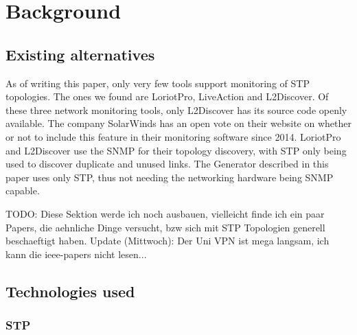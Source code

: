 \chapter{Background}
\section{Existing alternatives}
As of writing this paper, only very few tools support monitoring of STP topologies.
The ones we found are LoriotPro\cite{LoriotPro}, LiveAction\cite{LiveAction} and L2Discover\cite{L2Discover}.
Of these three network monitoring tools, only L2Discover has its source code openly available.
The company SolarWinds has an open vote on their website on whether or not to include this feature in their monitoring software since 2014\cite{thwackSW}.
LoriotPro and L2Discover use the SNMP for their topology discovery, with STP only being used to discover duplicate and unused links.
The Generator described in this paper uses only STP, thus not needing the networking hardware being SNMP capable.

TODO: Diese Sektion werde ich noch ausbauen, vielleicht finde ich ein paar Papers, die aehnliche Dinge versucht, bzw sich mit STP Topologien generell beschaeftigt haben.
Update (Mittwoch): Der Uni VPN ist mega langsam, ich kann die ieee-papers nicht lesen...

\section{Technologies used}
\subsection{STP}
